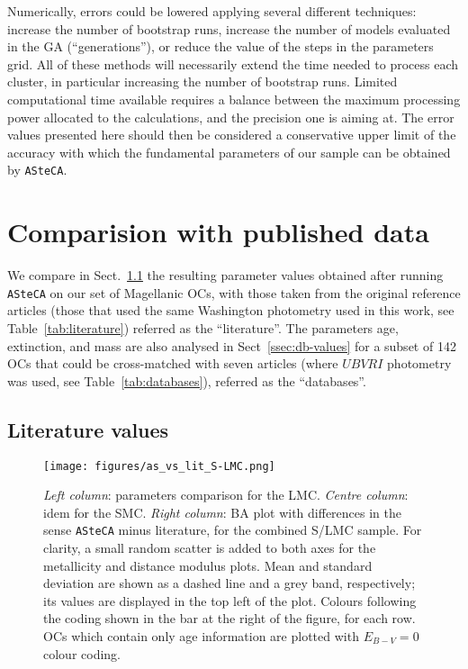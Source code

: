 \documentclass[a4paper,fleqn,usenatbib]{mnras}
\begin{document}
Numerically, errors could be lowered applying several different techniques:
increase the number of bootstrap runs, increase the number of models evaluated
in the GA (``generations''), or reduce the value of the steps in the parameters
grid.
%
All of these methods will necessarily extend the time needed to process each
cluster, in particular increasing the number of bootstrap runs. Limited
computational time available requires a balance between the maximum processing
power allocated to the calculations, and the precision one is aiming at. The
error values presented here should then be considered a conservative upper limit
of the accuracy with which the fundamental parameters of our sample can be
obtained by \texttt{ASteCA}.\@





\section{Comparision with published data}
\label{sec:comp-pub-data}

We compare in Sect.~\ref{ssec:lit-values} the resulting parameter values
obtained after running \texttt{ASteCA} on our set of Magellanic OCs, with those taken
from the original reference articles (those that used the same Washington
photometry used in this work, see Table~\ref{tab:literature}) referred as the
``literature''.
%
The parameters age, extinction, and mass are also analysed in
Sect~\ref{ssec:db-values} for a subset of 142 OCs that could be cross-matched
with seven articles (where $UBVRI$ photometry was used, see
Table~\ref{tab:databases}), referred as the ``databases''.

  

\subsection{Literature values}
\label{ssec:lit-values}

\begin{figure*}
\texttt{[image: figures/as\_vs\_lit\_S-LMC.png]}
\caption[Pass this otherwise it chokes with the cite]{\emph{Left column}:
parameters comparison for the LMC.\@
\emph{Centre column}: idem for the SMC.\@
\emph{Right column}: BA plot with differences in the sense \texttt{ASteCA} minus
literature, for the combined S/LMC sample. For clarity, a small random scatter
is added to both axes for the metallicity and distance modulus plots. Mean and
standard deviation are shown as a dashed line and a grey band, respectively; its
values are displayed in the top left of the plot.
Colours following the coding shown in the bar at the right of the figure, for
each row.~\cite{Piatti_2011b} OCs which contain only age information are plotted
with $E_{B-V}{=}0$ colour coding.}
\label{fig:as_vs_lit}
\end{figure*}
\end{document}
